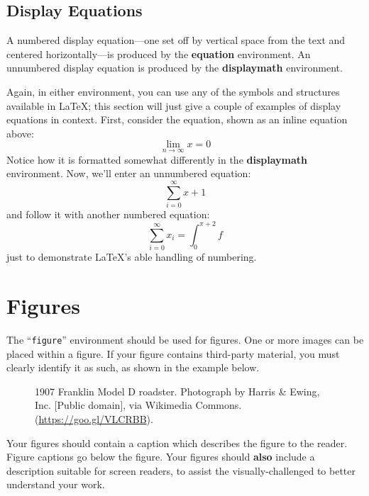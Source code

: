 \documentclass[sigconf]{acmart}
\begin{document}
\subsection{Display Equations}
A numbered display equation---one set off by vertical space from the
text and centered horizontally---is produced by the \textbf{equation}
environment. An unnumbered display equation is produced by the
\textbf{displaymath} environment.

Again, in either environment, you can use any of the symbols
and structures available in \LaTeX\@; this section will just
give a couple of examples of display equations in context.
First, consider the equation, shown as an inline equation above:
\begin{equation}
  \lim_{n\rightarrow \infty}x=0
\end{equation}
Notice how it is formatted somewhat differently in
the \textbf{displaymath}
environment.  Now, we'll enter an unnumbered equation:
\begin{displaymath}
  \sum_{i=0}^{\infty} x + 1
\end{displaymath}
and follow it with another numbered equation:
\begin{equation}
  \sum_{i=0}^{\infty}x_i=\int_{0}^{\pi+2} f
\end{equation}
just to demonstrate \LaTeX's able handling of numbering.

\section{Figures}

The ``\verb|figure|'' environment should be used for figures. One or more images can be placed within a figure. If your figure contains third-party material, you must clearly identify it as such, as shown in the example below.

\begin{figure}[h]
  \centering
  \caption{1907 Franklin Model D roadster. Photograph by Harris \& Ewing, Inc. [Public domain], via Wikimedia Commons. (\url{https://goo.gl/VLCRBB}).}
\end{figure}

Your figures should contain a caption which describes the figure to the reader. Figure captions go below the figure. Your figures should {\bf also} include a description suitable for screen readers, to assist the visually-challenged to better understand your work.
\end{document}
